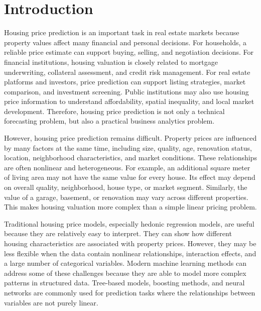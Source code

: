\documentclass[12pt,a4paper,oneside,openany]{book}
\begin{document}
\thispagestyle{empty}

\mbox{}

\clearpage



\tableofcontents

\clearpage


\chapter{Introduction}

Housing price prediction is an important task in real estate markets because property values affect many financial and personal decisions. For households, a reliable price estimate can support buying, selling, and negotiation decisions. For financial institutions, housing valuation is closely related to mortgage underwriting, collateral assessment, and credit risk management. For real estate platforms and investors, price prediction can support listing strategies, market comparison, and investment screening. Public institutions may also use housing price information to understand affordability, spatial inequality, and local market development. Therefore, housing price prediction is not only a technical forecasting problem, but also a practical business analytics problem.

However, housing price prediction remains difficult. Property prices are influenced by many factors at the same time, including size, quality, age, renovation status, location, neighborhood characteristics, and market conditions. These relationships are often nonlinear and heterogeneous. For example, an additional square meter of living area may not have the same value for every house. Its effect may depend on overall quality, neighborhood, house type, or market segment. Similarly, the value of a garage, basement, or renovation may vary across different properties. This makes housing valuation more complex than a simple linear pricing problem.

Traditional housing price models, especially hedonic regression models, are useful because they are relatively easy to interpret. They can show how different housing characteristics are associated with property prices. However, they may be less flexible when the data contain nonlinear relationships, interaction effects, and a large number of categorical variables. Modern machine learning methods can address some of these challenges because they are able to model more complex patterns in structured data. Tree-based models, boosting methods, and neural networks are commonly used for prediction tasks where the relationships between variables are not purely linear.
\end{document}

